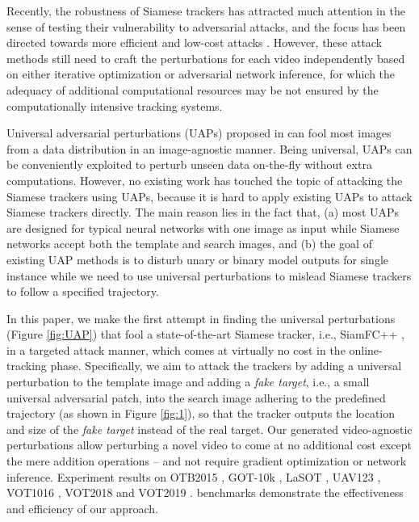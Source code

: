 \documentclass[journal]{IEEEtran}
\newcommand{\ie}{i.e.}
\begin{document}
Recently, the robustness of Siamese trackers has attracted much attention in the sense of testing their vulnerability to adversarial attacks, and the focus has been directed towards more efficient and low-cost attacks \cite{TTP,FAN,SPARK,chen2020one}. However, these attack methods still need to craft the perturbations for each video independently based on either iterative optimization or adversarial network inference, for which the adequacy of additional computational resources may be not ensured by the computationally intensive tracking systems. 

Universal adversarial perturbations (UAPs) proposed in \cite{UAP} can fool most images from a data distribution in an image-agnostic manner. Being universal, UAPs can be conveniently exploited to perturb unseen data on-the-fly without extra computations. However, no existing work has touched the topic of attacking the Siamese trackers using UAPs, because it is hard to apply existing UAPs to attack Siamese trackers directly. The main reason lies in the fact that, (a) most UAPs are designed for typical neural networks with one image as input while Siamese networks accept both the template and search images, and (b) the goal of existing UAP methods is to disturb unary or binary model outputs for single instance while we need to use universal perturbations to mislead Siamese trackers to follow a specified trajectory.
  
In this paper, we make the first attempt in finding the universal perturbations (Figure \ref{fig:UAP}) that fool a state-of-the-art Siamese tracker, \ie, SiamFC++ \cite{SiamFC++}, in a targeted attack manner, which comes at virtually no cost in the online-tracking phase. Specifically, we aim to attack the trackers by adding a universal perturbation to the template image and adding a \textit{fake target}, \ie, a small universal adversarial patch, into the search image adhering to the predefined trajectory (as shown in Figure \ref{fig:1}), so that the tracker outputs the location and size of the \textit{fake target} instead of the real target. Our generated video-agnostic perturbations allow perturbing a novel video to come at no additional cost except the mere addition operations -- and not require gradient optimization or network inference. Experiment results on OTB2015 \cite{OTB}, GOT-10k \cite{GOT-10k}, LaSOT \cite{GOT-10k}, UAV123 \cite{UAV123}, VOT1016 \cite{VOT2016}, VOT2018 \cite{VOT2018} and VOT2019 \cite{VOT2019}. benchmarks demonstrate the effectiveness and efficiency of our approach.
\end{document}
